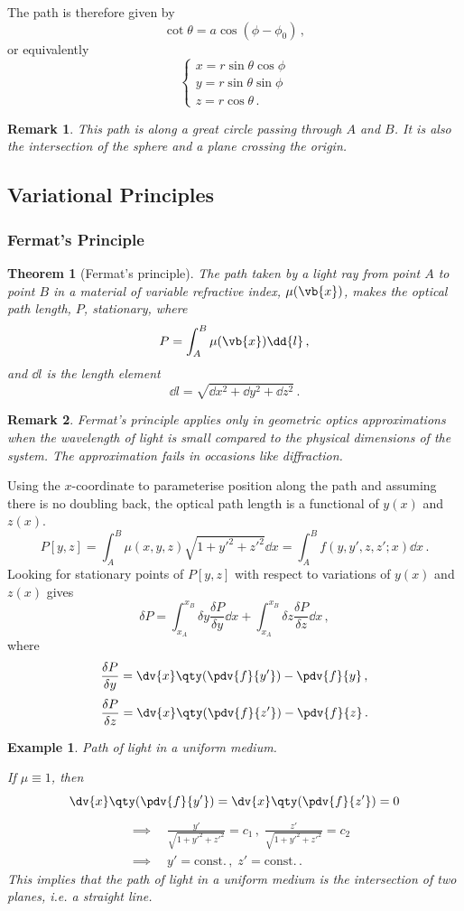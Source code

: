 \documentclass{article}
\theoremstyle{plain}\theoremheaderfont{\normalfont\itshape}\theorembodyfont{\rmfamily}\theoremseparator{.}\newtheorem*{rem}{Remark}\newtheorem*{ex}{Example}\newtheorem*{proof}{Proof}\newtheorem*{altp}{Alternative proof}
\theoremstyle{plain}\theoremheaderfont{\normalfont\bfseries}\theorembodyfont{\rmfamily}\theoremseparator{.}\newtheorem{thm}{Theorem}[section]\newtheorem{lem}[thm]{Lemma}\newtheorem{prop}[thm]{Proposition}\newtheorem*{cor}{Corollary}\newtheorem{defn}[thm]{Definition}\newtheorem{clm}[thm]{Claim}\newtheorem{clminproof}{Claim}
\theoremstyle{break}\theoremheaderfont{\normalfont\itshape}\theorembodyfont{\rmfamily}\theoremseparator{.\medskip}\newtheorem*{proofskip}{Proof}\newtheorem*{exs}{Examples}\newtheorem*{rems}{Remarks}
\theoremstyle{break}\theoremheaderfont{\normalfont\bfseries}\theorembodyfont{\rmfamily}\theoremseparator{.\medskip}\newtheorem{lemskip}[thm]{Lemma}\newtheorem{defnskip}[thm]{Definition}\newtheorem{propskip}[thm]{Proposition}\newtheorem{thmskip}[thm]{Theorem}
\numberwithin{equation}{section}
\begin{document}
	The path is therefore given by
	\[\cot\theta=a\cos(\phi-\phi_0)\,,\]
	or equivalently
	\[\begin{cases}
		x=r\sin\theta\cos\phi\\
		y=r\sin\theta\sin\phi\\
		z=r\cos\theta\,.
	\end{cases}\]

	\begin{rem}
		This path is along a \textit{great circle} passing through \(A\) and \(B\). It is also the intersection of the sphere and a plane crossing the origin.
	\end{rem}
	\subsection{Variational Principles}
	\subsubsection{Fermat's Principle}
	\begin{thm}[Fermat's principle]		
		The path taken by a light ray from point \(A\) to point \(B\) in a material of variable \textit{refractive index}, \(\mu(\vb{x})\), makes the \textit{optical path length}, \(P\), stationary, where
		\[P=\int_{A}^{B}\mu(\vb{x})\dd{l}\,,\]
		and \(\dd{l}\) is the length element
		\[\dd{l}=\sqrt{\dd{x}^2+\dd{y}^2+\dd{z}^2}\,.\]
	\end{thm}
	\begin{rem}
		Fermat's principle applies only in geometric optics approximations when the wavelength of light is small compared to the physical dimensions of the system. The approximation fails in occasions like diffraction.
	\end{rem}

	Using the \(x\)-coordinate to parameterise position along the path and assuming there is no doubling back, the optical path length is a functional of \(y(x)\) and \(z(x)\).
	\[P[y,z]=\int_{A}^{B}\mu(x,y,z)\sqrt{1+y'^2+z'^2}\dd{x}=\int_{A}^{B}f(y,y',z,z';x)\dd{x}\,.\]
	Looking for stationary points of \(P[y,z]\) with respect to variations of \(y(x)\) and \(z(x)\) gives
	\[\delta P=\int_{x_A}^{x_B}\delta y\frac{\delta P}{\delta y}\dd{x}+\int_{x_A}^{x_B}\delta z\frac{\delta P}{\delta z}\dd{x}\,,\]
	where
	\[\frac{\delta P}{\delta y}=\dv{x}\qty(\pdv{f}{y'})-\pdv{f}{y}\,,\]
	\[\frac{\delta P}{\delta z}=\dv{x}\qty(\pdv{f}{z'})-\pdv{f}{z}\,.\]

	\begin{ex}
		\textit{Path of light in a uniform medium.}
		
		If \(\mu\equiv 1\), then
		\[\dv{x}\qty(\pdv{f}{y'})=\dv{x}\qty(\pdv{f}{z'})=0\]
		\begin{align*}
			&\implies \quad \frac{y'}{\sqrt{1+y'^2+z'^2}}=c_1\,,\;\frac{z'}{\sqrt{1+y'^2+z'^2}}=c_2\\
			&\implies \quad y'=\text{const.}\,,\;z'=\text{const.}\,.
		\end{align*}
		This implies that the path of light in a uniform medium is the intersection of two planes, i.e. a straight line.
	\end{ex}		
\end{document}

